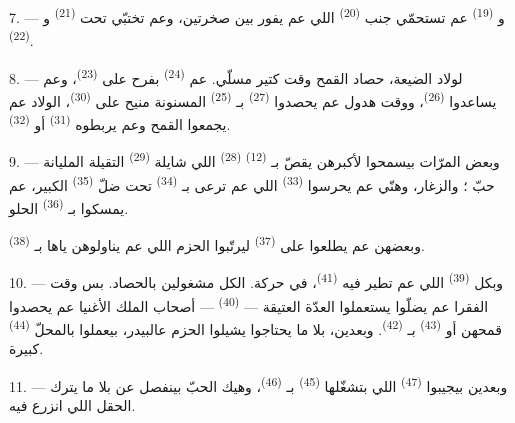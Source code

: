 7. --- و \textsuperscript{(19)} عم تستحمّي جنب
 \textsuperscript{(20)} اللي عم يفور بين صخرتين، وعم تختبّي
تحت  \textsuperscript{(21)} و
\textsuperscript{(22)}.

\VUsaut{5.0mm}
\VUsaut{3.4mm}

8. --- لولاد الضيعة، حصاد القمح وقت كتير مسلّي. عم 
\textsuperscript{(24)} بفرح على  \textsuperscript{(23)}،
وعم يساعدوا  \textsuperscript{(26)}، ووقت هدول عم يحصدوا
 \textsuperscript{(27)} بـ
\textsuperscript{(25)} المسنونة منيح على 
\textsuperscript{(30)}، الولاد عم يجمعوا القمح وعم يربطوه 
\textsuperscript{(31)} أو  \textsuperscript{(32)}.

9. --- وبعض المرّات بيسمحوا لأكبرهن يقصّ بـ
\textsuperscript{(12)}  \textsuperscript{(28)} اللي
شايلة  \textsuperscript{(29)} التقيلة المليانة حبّ ؛
والزغار، وهنّي عم يحرسوا  \textsuperscript{(33)} اللي عم
ترعى بـ \textsuperscript{(34)} تحت ضلّ 
\textsuperscript{(35)} الكبير، عم يمسكوا بـ
\textsuperscript{(36)}  الحلو.

وبعضهن عم يطلعوا على  \textsuperscript{(37)} ليرتّبوا
الحزم اللي عم يناولوهن ياها بـ \textsuperscript{(38)}.

10. --- وبكل  \textsuperscript{(39)} اللي عم تطير فيه
 \textsuperscript{(41)}، في حركة. الكل مشغولين بالحصاد. بس
وقت الفقرا عم يضلّوا يستعملوا العدّة العتيقة —  \textsuperscript{(40)} — أصحاب الملك الأغنيا عم يحصدوا
قمحهن أو  \textsuperscript{(43)} بـ
\textsuperscript{(42)}. وبعدين، بلا ما يحتاجوا يشيلوا الحزم عالبيدر،
بيعملوا بالمحلّ  \textsuperscript{(44)} كبيرة.

11. --- وبعدين بيجيبوا  \textsuperscript{(47)} اللي
بتشغّلها  \textsuperscript{(45)} بـ \textsuperscript{(46)}، وهيك الحبّ بينفصل عن  بلا ما
يترك الحقل اللي انزرع فيه.

\VUsaut{5.0mm}
\VUsaut{3.4mm}


